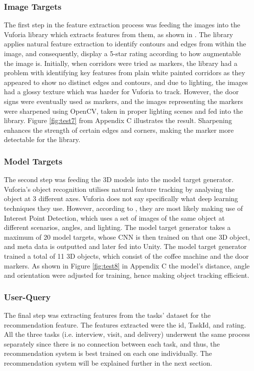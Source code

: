 \documentclass{aifyp}
\begin{document}
\subsubsection{Image Targets}
The first step in the feature extraction process was feeding the images into the Vuforia library which extracts features from them, as shown in \cite{VuforiaUnity}. The library applies natural feature extraction to identify contours and edges from within the image, and consequently, display a 5-star rating according to how augmentable the image is. Initially, when corridors were tried as markers, the library had a problem with identifying key features from plain white painted corridors as they appeared to show no distinct edges and contours, and due to lighting, the images had a glossy texture which was harder for Vuforia to track. However, the door signs were eventually used as markers, and the images representing the markers were sharpened using OpenCV, taken in proper lighting scenes and fed into the library. Figure \ref{fig:test7} from Appendix C illustrates the result. Sharpening enhances the strength of certain edges and corners, making the marker more detectable for the library.
\subsubsection{Model Targets}
The second step was feeding the 3D models into the model target generator. Vuforia’s object recognition utilises natural feature tracking by analysing the object at 3 different axes. Vuforia does not say specifically what deep learning techniques they use. However, according to \cite{VuforiaUnity}, they are most likely making use of Interest Point Detection, which uses a set of images of the same object at different scenarios, angles, and lighting. The model target generator takes a maximum of 20 model targets, whose CNN is then trained on that one 3D object, and meta data is outputted and later fed into Unity. The model target generator trained a total of 11 3D objects, which consist of the coffee machine and the door markers. As shown in Figure \ref{fig:test8} in Appendix C the model's distance, angle and orientation were adjusted for training, hence making object tracking efficient. 
\subsubsection{User-Query}
The final step was extracting features from the tasks’ dataset for the recommendation feature. The features extracted were the id, TaskId, and rating. All the three tasks (i.e. interview, visit, and delivery) underwent the same process separately since there is no connection between each task, and thus, the recommendation system is best trained on each one individually. The recommendation system will be explained further in the next section.
\end{document}
